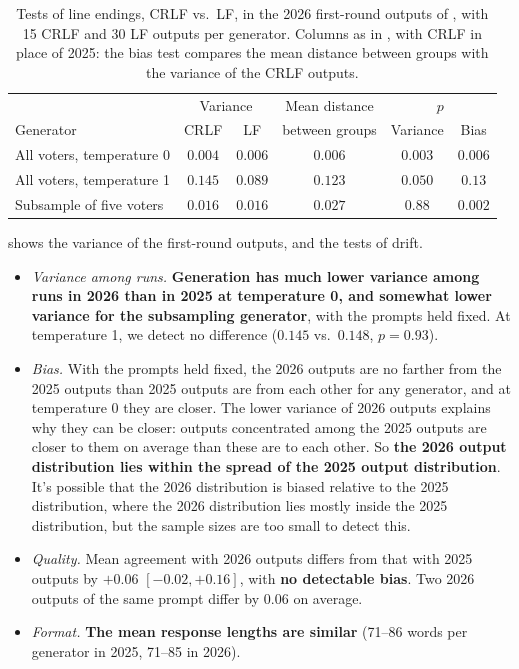 \documentclass[letterpaper]{article} %
\begin{document}
\begin{table}[t]
\centering
\begin{tabular}{lccccc}
\hline
& \multicolumn{2}{c}{Variance} & Mean distance & \multicolumn{2}{c}{\(p\)} \\
Generator & CRLF & LF & between groups & Variance & Bias \\
\hline
All voters, temperature 0 & \(0.004\) & \(0.006\) & \(0.006\) & \(0.003\) & \(0.006\) \\
All voters, temperature 1 & \(0.145\) & \(0.089\) & \(0.123\) & \(0.050\) & \(0.13\) \\
Subsample of five voters & \(0.016\) & \(0.016\) & \(0.027\) & \(0.88\) & \(0.002\) \\
\hline
\end{tabular}
\caption{Tests of line endings, CRLF vs.\ LF, in the 2026 first-round outputs of , with 15 CRLF and 30 LF outputs per generator. Columns as in , with CRLF in place of 2025: the bias test compares the mean distance between groups with the variance of the CRLF outputs.}
\label{tab:line-endings-generation-tests}
\end{table}

 shows the variance of the first-round outputs, and  the tests of drift.
\begin{itemize}
    \item \emph{Variance among runs.}
    \textbf{Generation has much lower variance among runs in 2026 than in 2025 at temperature 0, and somewhat lower variance for the subsampling generator}, with the prompts held fixed.
    At temperature 1, we detect no difference (\(0.145\) vs.\ \(0.148\), \(p = 0.93\)).
    \item \emph{Bias.}
    With the prompts held fixed, the 2026 outputs are no farther from the 2025 outputs than 2025 outputs are from each other for any generator, and at temperature 0 they are closer.
    The lower variance of 2026 outputs explains why they can be closer: outputs concentrated among the 2025 outputs are closer to them on average than these are to each other.
    So \textbf{the 2026 output distribution lies within the spread of the 2025 output distribution}.
    It's possible that the 2026 distribution is biased relative to the 2025 distribution, where the 2026 distribution lies mostly inside the 2025 distribution, but the sample sizes are too small to detect this.
    \item \emph{Quality.}
    Mean agreement with 2026 outputs differs from that with 2025 outputs by \(+0.06\) \([-0.02, +0.16]\), with \textbf{no detectable bias}.
    Two 2026 outputs of the same prompt differ by \(0.06\) on average.
    \item \emph{Format.}
    \textbf{The mean response lengths are similar} (71--86 words per generator in 2025, 71--85 in 2026).
\end{itemize}
\end{document}
